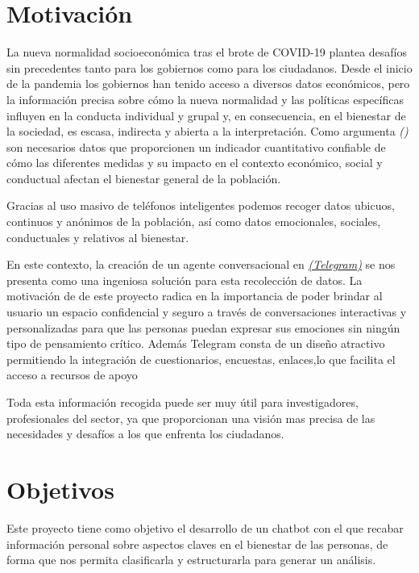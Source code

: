 \section{Motivación}

La nueva normalidad socioeconómica tras el brote de COVID-19 plantea desafíos sin precedentes tanto para los gobiernos como para los ciudadanos. Desde el inicio de la pandemia los gobiernos han tenido acceso a diversos datos económicos, pero la información precisa sobre cómo la nueva normalidad y las políticas específicas influyen en la conducta individual y grupal y, en consecuencia, en el bienestar de la sociedad, es escasa, indirecta y abierta a la interpretación. Como argumenta \textit{(\cite{medicion2009})} son necesarios datos que proporcionen un indicador cuantitativo confiable de cómo las diferentes medidas y su impacto en el contexto económico, social y conductual afectan el bienestar general de la población.\vspace{0.3cm}

Gracias al uso masivo de teléfonos inteligentes podemos recoger datos ubicuos, continuos y anónimos de la población, así como datos emocionales, sociales, conductuales y relativos al bienestar.\vspace{0.3cm}

En este contexto, la creación de un agente conversacional en \href{https://telegram.com.es/}{\textit{(Telegram)}} se nos presenta como una ingeniosa solución para esta recolección de datos. La motivación de de este proyecto radica en la importancia de poder brindar al usuario un espacio confidencial y seguro a través de conversaciones interactivas y personalizadas para que las personas puedan expresar sus emociones sin ningún tipo de pensamiento crítico.
Además Telegram consta de un diseño atractivo permitiendo la integración de cuestionarios, encuestas, enlaces,lo que facilita el acceso a recursos de apoyo\vspace{0.3cm}

Toda esta información recogida puede ser muy útil para investigadores, profesionales del sector, ya que proporcionan una visión mas precisa de las necesidades y desafíos a los que enfrenta los ciudadanos. 




\section{Objetivos}

Este proyecto tiene como objetivo el desarrollo de un chatbot con el que recabar información personal sobre aspectos claves en el bienestar de las personas, de forma que nos permita clasificarla y estructurarla para generar un análisis. 

